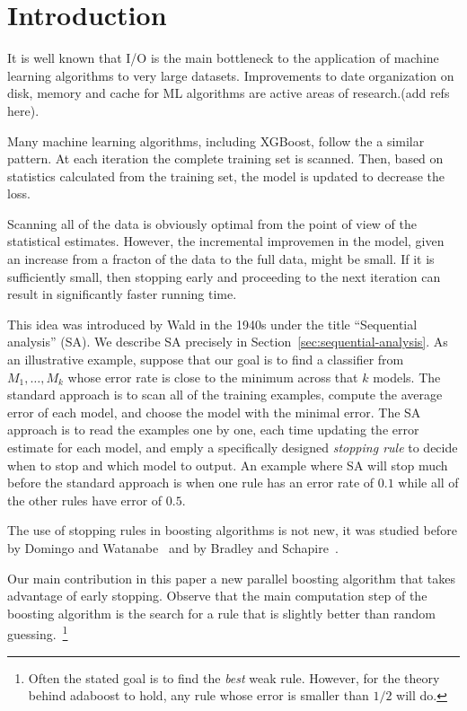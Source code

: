 \section{Introduction}\label{sec:intro}

It is well known that I/O is the main bottleneck to the application of
machine learning algorithms to very large datasets. Improvements to
date organization on disk, memory and cache for ML algorithms are
active areas of research.(add refs here).

Many machine learning algorithms, including XGBoost,
follow the a similar pattern. At each iteration the complete training
set is scanned. Then, based on statistics calculated from the training
set, the model is updated to decrease the loss.

Scanning all of the data is obviously optimal from the point of view
of the statistical estimates. However, the incremental improvemen in
the model, given an increase from a fracton of the data to the full
data, might be small. If it is sufficiently small, then stopping early
and proceeding to the next iteration can result in significantly
faster running time.

This idea was introduced by Wald\cite{wald_sequential_1973} in the
1940s under the title ``Sequential analysis'' (SA). We describe SA
precisely in Section~\ref{sec:sequential-analysis}. As an illustrative
example, suppose that our goal is to find a classifier from
$M_1,\ldots,M_k$ whose error rate is close to the minimum across that
$k$ models. The standard approach is to scan all of the training
examples, compute the average error of each model, and choose the
model with the minimal error. The SA approach is to read the examples
one by one, each time updating the error estimate for each model, and
emply a specifically designed {\em stopping rule} to decide when to
stop and which model to output. An example where SA will stop much
before the standard approach is when one rule has an error rate of
$0.1$ while all of the other rules have error of $0.5$.

The use of stopping rules in boosting algorithms is not new, it was
studied before by Domingo and Watanabe~\cite{domingo_scaling_2000} and
by Bradley and Schapire~\cite{bradley_filterboost:_2007}.

Our main contribution in this paper a new parallel boosting algorithm
that takes advantage of early stopping. Observe that the main
computation step of the boosting algorithm is the search for a rule
that is slightly better than random guessing.~\footnote{Often the
  stated goal is to find the {\em best} weak rule. However, for the
  theory behind adaboost to hold, any rule whose error is smaller than
  $1/2$ will do.}

